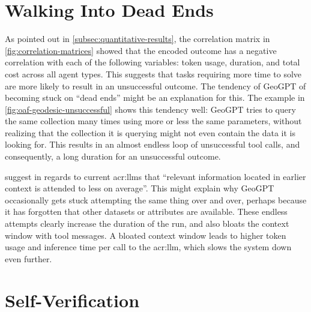 \section[Walking Into Dead Ends]{Walking Into Dead Ends}
\label{sec:dead-ends}


As pointed out in \autoref{subsec:quantitative-results}, the correlation matrix in \autoref{fig:correlation-matrices} showed that the encoded outcome has a negative correlation with each of the following variables: token usage, duration, and total cost across all agent types. This suggests that tasks requiring more time to solve are more likely to result in an unsuccessful outcome. The tendency of GeoGPT of becoming stuck on \enquote{dead ends} might be an explanation for this. The example in \autoref{fig:oaf-geodesic-unsuccessful} shows this tendency well: GeoGPT tries to query the same collection many times using more or less the same parameters, without realizing that the collection it is querying might not even contain the data it is looking for. This results in an almost endless loop of unsuccessful tool calls, and consequently, a long duration for an unsuccessful outcome.

\cite{peysakhovichAttentionSortingCombats2023} suggest in regards to current \acrshort{acr:llm}s that \enquote{relevant information located in earlier context is attended to less on average}. This might explain why GeoGPT occasionally gets stuck attempting the same thing over and over, perhaps because it has forgotten that other datasets or attributes are available. These endless attempts clearly increase the duration of the run, and also bloats the context window with tool messages. A bloated context window leads to higher token usage and inference time per call to the \acrshort{acr:llm}, which slows the system down even further.


\section{Self-Verification}
\label{sec:self-verification}

